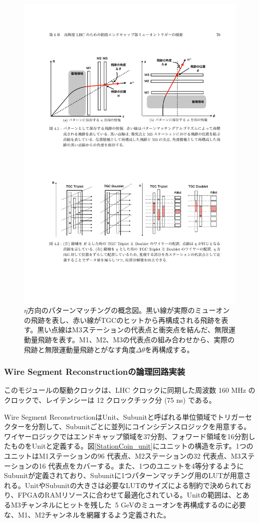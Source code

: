 \begin{figure} 
\centering
\includegraphics[width=12cm]{fig/SL/Concept_segment.pdf}
\caption[Segment Reconstructionのコンセプト]{$\eta$方向のパターンマッチングの概念図\cite{mt_mino}。黒い線が実際のミューオンの飛跡を表し、赤い線がTGCのヒットから再構成される飛跡を表す。黒い点線はM3ステーションの代表点と衝突点を結んだ、無限運動量飛跡を表す。M1、M2、M3の代表点の組み合わせから、実際の飛跡と無限運動量飛跡とがなす角度$\Delta\theta$を再構成する。}
\label{Concept_segment}
\end{figure}

\subsubsection*{Wire Segment Reconstructionの論理回路実装}
このモジュールの駆動クロックは、LHC クロックに同期した周波数 160 MHz のクロックで、レイテンシーは 12 クロックチック分 (75 ns) である。

Wire Segment ReconstructionはUnit、Subunitと呼ばれる単位領域でトリガーセクターを分割して、Subunitごとに並列にコインシデンスロジックを用意する。ワイヤーロジックではエンドキャップ領域を37分割、フォワード領域を16分割したものをUnitと定義する。図\ref{StationCoin_unit}にユニットの構造を示す。1つのユニットはM1ステーションの96 代表点、M2ステーションの32 代表点、M3ステーションの16 代表点をカバーする。また、1つのユニットを4等分するようにSubunitが定義されており、Subunitに1つパターンマッチング用のLUTが用意される。UnitやSubunitの大きさは必要なLUTのサイズによる制約で決められており、FPGAのRAMリソースに合わせて最適化されている。Unitの範囲は、とあるM3チャンネルにヒットを残した \pt$\,$5 GeVのミューオンを再構成するのに必要な、M1、M2チャンネルを網羅するよう定義された。

